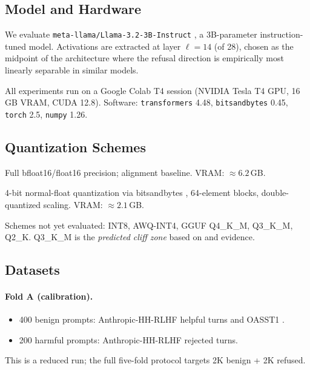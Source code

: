 \documentclass[11pt,a4paper]{article}
\begin{document}
\subsection{Model and Hardware}

We evaluate \texttt{meta-llama/Llama-3.2-3B-Instruct} \citep{meta2024llama3},
a 3B-parameter instruction-tuned model.
Activations are extracted at layer $\ell = 14$ (of 28), chosen as the midpoint
of the architecture where the refusal direction is empirically most linearly
separable in similar models.

All experiments run on a Google Colab T4 session (NVIDIA Tesla T4 GPU, 16\,GB
VRAM, CUDA 12.8).
Software: \texttt{transformers} 4.48, \texttt{bitsandbytes} 0.45,
\texttt{torch} 2.5, \texttt{numpy} 1.26.

\subsection{Quantization Schemes}

\begin{description}[leftmargin=2em, itemsep=2pt]
  \item[FP16] Full bfloat16/float16 precision; alignment baseline.
        VRAM: ${\approx}6.2$\,GB.
  \item[NF4] 4-bit normal-float quantization via bitsandbytes
        \citep{dettmers2023qlora}, 64-element blocks, double-quantized scaling.
        VRAM: ${\approx}2.1$\,GB.
\end{description}

Schemes not yet evaluated: INT8, AWQ-INT4, GGUF Q4\_K\_M, Q3\_K\_M, Q2\_K.
Q3\_K\_M is the \emph{predicted cliff zone} based on
\citet{egashira2024exploiting} and \citet{mindthegap2025} evidence.

\subsection{Datasets}

\paragraph{Fold A (calibration).}
\begin{itemize}[leftmargin=1.5em, itemsep=1pt]
  \item 400 benign prompts: Anthropic-HH-RLHF helpful turns
        \citep{bai2022training} and OASST1 \citep{kopf2023openassistant}.
  \item 200 harmful prompts: Anthropic-HH-RLHF rejected turns.
\end{itemize}
This is a reduced run; the full five-fold protocol targets 2K benign + 2K refused.
\end{document}
